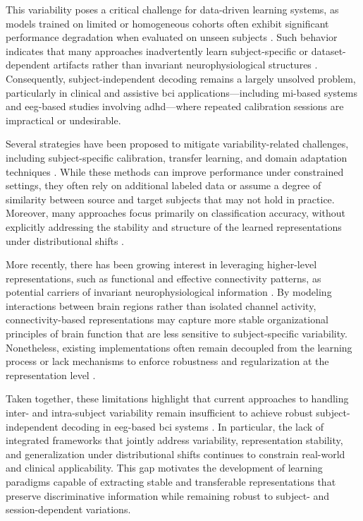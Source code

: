 This variability poses a critical challenge for data-driven learning systems, as models trained on limited or homogeneous cohorts often exhibit significant performance degradation when evaluated on unseen subjects \cite{saha2020intra}. Such behavior indicates that many approaches inadvertently learn subject-specific or dataset-dependent artifacts rather than invariant neurophysiological structures \cite{lotte2018review}. Consequently, subject-independent decoding remains a largely unsolved problem, particularly in clinical and assistive \gls{bci} applications—including \gls{mi}-based systems and \gls{eeg}-based studies involving \gls{adhd}—where repeated calibration sessions are impractical or undesirable.

Several strategies have been proposed to mitigate variability-related challenges, including subject-specific calibration, transfer learning, and domain adaptation techniques \cite{al2025emotion}. While these methods can improve performance under constrained settings, they often rely on additional labeled data or assume a degree of similarity between source and target subjects that may not hold in practice. Moreover, many approaches focus primarily on classification accuracy, without explicitly addressing the stability and structure of the learned representations under distributional shifts \cite{wang2024dmmr}.

More recently, there has been growing interest in leveraging higher-level representations, such as functional and effective connectivity patterns, as potential carriers of invariant neurophysiological information \cite{faes2017information}. By modeling interactions between brain regions rather than isolated channel activity, connectivity-based representations may capture more stable organizational principles of brain function that are less sensitive to subject-specific variability. Nonetheless, existing implementations often remain decoupled from the learning process or lack mechanisms to enforce robustness and regularization at the representation level \cite{rolls2022effective}.

Taken together, these limitations highlight that current approaches to handling inter- and intra-subject variability remain insufficient to achieve robust subject-independent decoding in \gls{eeg}-based \gls{bci} systems \cite{lotte2018review,saha2020intra}. In particular, the lack of integrated frameworks that jointly address variability, representation stability, and generalization under distributional shifts continues to constrain real-world and clinical applicability. This gap motivates the development of learning paradigms capable of extracting stable and transferable representations that preserve discriminative information while remaining robust to subject- and session-dependent variations.

